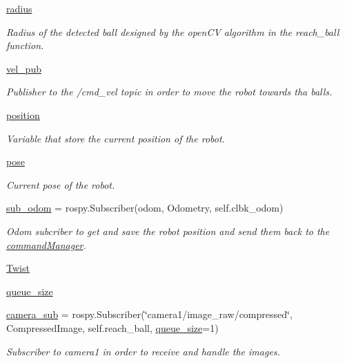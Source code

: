 \begin{DoxyCompactItemize}
\hyperlink{classtrack_1_1TrackAction_a0773416696b3fd6ed1dff306eb26c84a}{radius}
\begin{DoxyCompactList}\small\item\em Radius of the detected ball designed by the open\+CV algorithm in the reach\+\_\+ball function. \end{DoxyCompactList}\item 
\hyperlink{classtrack_1_1TrackAction_af6105c2cad0d325296213d7c03c4fb6e}{vel\+\_\+pub}
\begin{DoxyCompactList}\small\item\em Publisher to the /cmd\+\_\+vel topic in order to move the robot towards tha balls. \end{DoxyCompactList}\item 
\hyperlink{classtrack_1_1TrackAction_af8f5740ee3298f2c093006fe1314a268}{position}
\begin{DoxyCompactList}\small\item\em Variable that store the current position of the robot. \end{DoxyCompactList}\item 
\hyperlink{classtrack_1_1TrackAction_a25be61bbb562612dc1e1c5e7c448fa4c}{pose}
\begin{DoxyCompactList}\small\item\em Current pose of the robot. \end{DoxyCompactList}\item 
\hyperlink{classtrack_1_1TrackAction_a4cbc03d130bcf2203bc68f37d02dc4c5}{sub\+\_\+odom} = rospy.\+Subscriber(\textquotesingle{}odom\textquotesingle{}, Odometry, self.\+clbk\+\_\+odom)
\begin{DoxyCompactList}\small\item\em Odom subcriber to get and save the robot position and send them back to the \hyperlink{namespacecommandManager}{command\+Manager}. \end{DoxyCompactList}\item 
\hyperlink{classtrack_1_1TrackAction_aabd955eb5b74ee508ba27bf6db4129e2}{Twist}
\item 
\hyperlink{classtrack_1_1TrackAction_a47112fa77bb24c45494449d781bd35c4}{queue\+\_\+size}
\item 
\hyperlink{classtrack_1_1TrackAction_a71b1a13ec7fb0ba79d6f34416b7d54e1}{camera\+\_\+sub} = rospy.\+Subscriber(\char`\"{}camera1/image\+\_\+raw/compressed\char`\"{}, Compressed\+Image, self.\+reach\+\_\+ball, \hyperlink{classtrack_1_1TrackAction_a47112fa77bb24c45494449d781bd35c4}{queue\+\_\+size}=1)
\begin{DoxyCompactList}\small\item\em Subscriber to camera1 in order to receive and handle the images. \end{DoxyCompactList}\item 

\end{DoxyCompactItemize}
